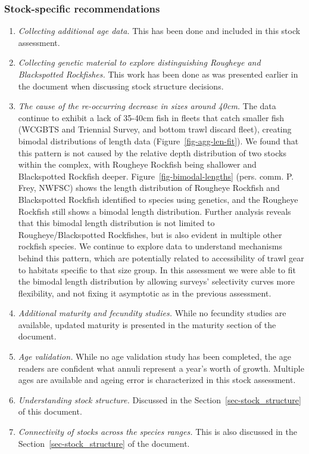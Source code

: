 \documentclass[
]{scrartcl}
\providecommand{\tightlist}{%
  \setlength{\itemsep}{0pt}\setlength{\parskip}{0pt}}\usepackage{longtable,booktabs,array}
\begin{document}
\subsubsection{Stock-specific
recommendations}\label{stock-specific-recommendations}

\begin{enumerate}
\def\labelenumi{\arabic{enumi}.}
\tightlist
\item
  \emph{Collecting additional age data.} This has been done and included
  in this stock assessment.
\item
  \emph{Collecting genetic material to explore distinguishing Rougheye
  and Blackspotted Rockfishes.} This work has been done as was presented
  earlier in the document when discussing stock structure decisions.
\item
  \emph{The cause of the re-occurring decrease in sizes around 40cm.}
  The data continue to exhibit a lack of 35-40cm fish in fleets that
  catch smaller fish (WCGBTS and Triennial Survey, and bottom trawl
  discard fleet), creating bimodal distributions of length data
  (Figure~\ref{fig-agg-len-fit}). We found that this pattern is not
  caused by the relative depth distribution of two stocks within the
  complex, with Rougheye Rockfish being shallower and Blackspotted
  Rockfish deeper. Figure~\ref{fig-bimodal-lengths} (pers. comm. P.
  Frey, NWFSC) shows the length distribution of Rougheye Rockfish and
  Blackspotted Rockfish identified to species using genetics, and the
  Rougheye Rockfish still shows a bimodal length distribution. Further
  analysis reveals that this bimodal length distribution is not limited
  to Rougheye/Blackspotted Rockfishes, but is also evident in multiple
  other rockfish species. We continue to explore data to understand
  mechanisms behind this pattern, which are potentially related to
  accessibility of trawl gear to habitats specific to that size group.
  In this assessment we were able to fit the bimodal length distribution
  by allowing surveys' selectivity curves more flexibility, and not
  fixing it asymptotic as in the previous assessment.
\item
  \emph{Additional maturity and fecundity studies.} While no fecundity
  studies are available, updated maturity is presented in the maturity
  section of the document.
\item
  \emph{Age validation.} While no age validation study has been
  completed, the age readers are confident what annuli represent a
  year's worth of growth. Multiple ages are available and ageing error
  is characterized in this stock assessment.
\item
  \emph{Understanding stock structure.} Discussed in the
  Section~\ref{sec-stock_structure} of this document.
\item
  \emph{Connectivity of stocks across the species ranges.} This is also
  discussed in the Section~\ref{sec-stock_structure} of the document.
\end{enumerate}
\end{document}
